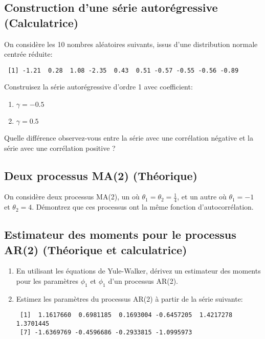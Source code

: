 \documentclass[11pt,english,francais]{article}
\begin{document}
\subsection{Construction d'une série autorégressive (Calculatrice)}
\label{sec:constr-dune-serie}

On considère les 10 nombres aléatoires suivants, issus d'une distribution normale centrée réduite:

\begin{verbatim}
 [1] -1.21  0.28  1.08 -2.35  0.43  0.51 -0.57 -0.55 -0.56 -0.89
\end{verbatim}

Construisez la série autorégressive d'ordre 1 avec coefficient: 
\begin{enumerate}
\item $\gamma = -0.5$
\item $\gamma = 0.5$
\end{enumerate}

Quelle différence observez-vous entre la série avec une corrélation négative et la série avec une corrélation positive ?

\subsection{Deux processus MA(2) (Théorique)}

On considère deux processus MA(2), un où $\theta_1 = \theta_2 = \frac{1}{4}$, et un autre où $\theta_1=-1$ et $\theta_2 = 4$. Démontrez que ces processus ont la même fonction d'autocorrélation.

\subsection{Estimateur des moments pour le processus AR(2) (Théorique et calculatrice)}

\begin{enumerate}
\item En utilisant les équations de Yule-Walker, dérivez un estimateur des moments pour les paramètres $\phi_1$ et $\phi_1$ d'un processus AR(2). \\

\item Estimez les paramètres du processus AR(2) à partir de la série suivante:
\begin{verbatim}
 [1]  1.1617660  0.6981185  0.1693004 -0.6457205  1.4217278  1.3701445
 [7] -1.6369769 -0.4596686 -0.2933815 -1.0995973
\end{verbatim}
\end{enumerate}
\end{document}
